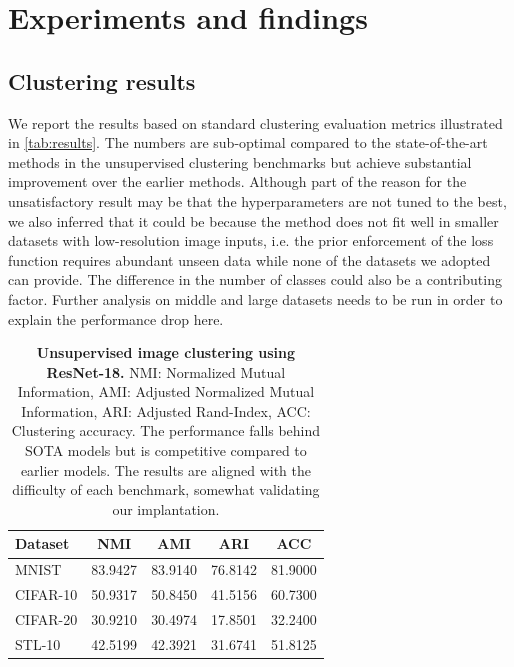 \documentclass{article}
\begin{document}
\section{Experiments and findings}
\label{sec:results}
\subsection{Clustering results}
We report the results based on standard clustering evaluation metrics illustrated in \autoref{tab:results}. The numbers are sub-optimal compared to the state-of-the-art methods in the unsupervised clustering benchmarks but achieve substantial improvement over the earlier methods. Although part of the reason for the unsatisfactory result may be that the hyperparameters are not tuned to the best, we also inferred that it could be because the method does not fit well in smaller datasets with low-resolution image inputs, i.e. the prior enforcement of the loss function requires abundant unseen data while none of the datasets we adopted can provide. The difference in the number of classes could also be a contributing factor. Further analysis on middle and large datasets needs to be run in order to explain the performance drop here.

\begin{table}[h!]
  \caption{\textbf{Unsupervised image clustering using ResNet-18.} NMI: Normalized Mutual Information, AMI: Adjusted Normalized Mutual Information, ARI: Adjusted Rand-Index, ACC: Clustering accuracy. The performance falls behind SOTA models but is competitive compared to earlier models. The results are aligned with the difficulty of each benchmark, somewhat validating our implantation.}
  \label{tab:results}
  \centering
  \begin{tabular}{lcccc}
    \toprule
    Dataset  & NMI    &  AMI     & ARI   & ACC  \\
    \midrule
    MNIST\cite{mnist}   & 83.9427 & 83.9140 & 76.8142 & 81.9000 \\
    CIFAR-10 \cite{cifar_10} & 50.9317 & 50.8450 & 41.5156 & 60.7300 \\
    CIFAR-20 \cite{cifar_100} & 30.9210 & 30.4974 & 17.8501 & 32.2400 \\
    STL-10 \cite{stl_10}  & 42.5199 & 42.3921 & 31.6741 & 51.8125	\\
    \bottomrule
  \end{tabular}
\end{table}
\end{document}

